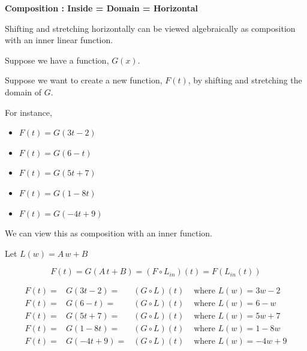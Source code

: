 \documentclass{ximera}
\begin{document}
\textbf{\textcolor{red!70!black}{Composition : Inside = Domain = Horizontal}}


Shifting and stretching horizontally can be viewed algebraically as composition with an inner linear function.



Suppose we have a function, $G(x)$. 

Suppose we want to create a new function, $F(t)$, by shifting and stretching the domain of $G$.


For instance, 
\begin{itemize}
\item $F(t) = G(3t-2)$
\item $F(t) = G(6-t)$
\item $F(t) = G(5t+7)$
\item $F(t) = G(1-8t)$
\item $F(t) = G(-4t+9)$
\end{itemize}


We can view this as composition with an inner function.

Let $L(w) = A \, w + B$


\[ F(t) = G(A \, t + B) = (F \circ L_{in})(t) = F(L_{in}(t))\]




\begin{align*}
F(t) =& G(3t-2) =& (G \circ L)(t)  & \text{ where } L(w) = 3w-2 \\
F(t) =& G(6-t) =& (G \circ L)(t)   & \text{ where } L(w) = 6-w    \\
F(t) =& G(5t+7) =& (G \circ L)(t)  & \text{ where } L(w) = 5w+7   \\
F(t) =& G(1-8t) =& (G \circ L)(t)  & \text{ where } L(w) = 1-8w    \\
F(t) =& G(-4t+9) =& (G \circ L)(t) & \text{ where } L(w) = -4w+9   
\end{align*}
\end{document}
